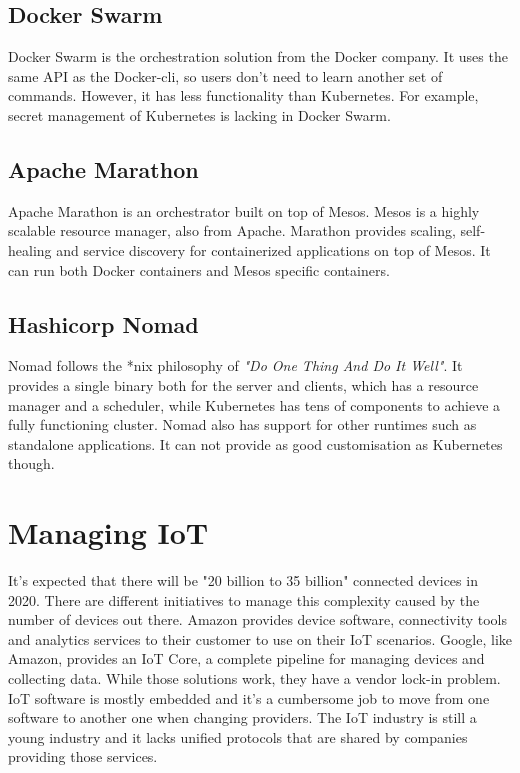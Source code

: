 \newpage
\subsection*{Docker Swarm}
Docker Swarm is the orchestration solution from the Docker company. It uses the same API as the Docker-cli, so users don't need to learn another set of commands. However, it has less functionality than Kubernetes. For example, secret management of Kubernetes is lacking in Docker Swarm.

\subsection*{Apache Marathon}
Apache Marathon is an orchestrator built on top of Mesos. Mesos is a highly scalable resource manager, also from Apache. Marathon provides scaling, self-healing and service discovery for containerized applications on top of Mesos. It can run both Docker containers and Mesos specific containers.

\subsection*{Hashicorp Nomad}
Nomad follows the *nix philosophy of \textit{"Do One Thing And Do It Well"}. It provides a single binary both for the server and clients, which has a resource manager and a scheduler, while Kubernetes has tens of components to achieve a fully functioning cluster. Nomad also has support for other runtimes such as standalone applications. It can not provide as good customisation as Kubernetes though.

\section{Managing IoT}
It's expected that there will be "20 billion to 35 billion" \cite{unikernels-improve} connected devices in 2020. There are different initiatives to manage this complexity caused by the number of devices out there. Amazon provides device software, connectivity tools and analytics services to their customer to use on their IoT scenarios. Google, like Amazon, provides an IoT Core, a complete pipeline for managing devices and collecting data. While those solutions work, they have a vendor lock-in problem. IoT software is mostly embedded and it's a cumbersome job to move from one software to another one when changing providers. The IoT industry is still a young industry and it lacks unified protocols that are shared by companies providing those services.

